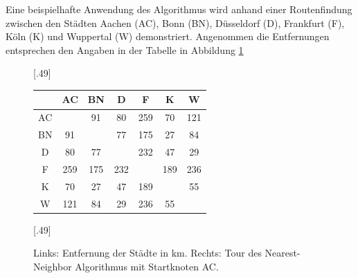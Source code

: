 \documentclass{article}
\begin{document}
Eine beispielhafte Anwendung des Algorithmus wird anhand einer Routenfindung zwischen den Städten Aachen (AC), Bonn (BN), Düsseldorf (D), Frankfurt (F), Köln (K) und Wuppertal (W) demonstriert. Angenommen die Entfernungen entsprechen den Angaben in der Tabelle in Abbildung \ref{fig:nearest-neighbor-beispiel}


\begin{figure}[h]
	\centering
	\subcaptionbox{\label{tbl:entfernungen-staedte}}[.49\linewidth]
	{
		\begin{tabular}{ |c|c|c|c|c|c|c| }
\hline
 & AC & BN & D& F & K & W \\ 
\hline
AC &  & 91 & 80 & 259 & 70 & 121 \\ 
\hline
BN & 91 &  & 77 & 175 & 27 & 84 \\ 
\hline
D & 80 & 77 &  & 232 & 47 & 29 \\ 
\hline
F & 259 & 175 & 232 &  & 189 & 236 \\ 
\hline
K & 70 & 27 & 47 & 189 &  & 55 \\ 
\hline
W & 121 & 84 & 29 & 236 & 55 &  \\ 
\hline
\end{tabular}
	}
	\subcaptionbox{\label{fig:nearest-neighbor-tour}}[.49\linewidth]
	{
	}
\caption{Links: Entfernung der Städte in km. Rechts: Tour des Nearest-Neighbor Algorithmus mit Startknoten AC.}
\label{fig:nearest-neighbor-beispiel}
\end{figure}

\end{document}
